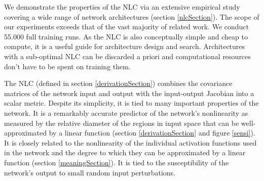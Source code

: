 \documentclass{article} %
\begin{document}
We demonstrate the properties of the NLC via an extensive empirical study covering a wide range of network architectures (section \ref{nlcSection}). The scope of our experiments exceeds that of the vast majority of related work. We conduct 55.000 full training runs. As the NLC is also conceptually simple and cheap to compute, it is a useful guide for architecture design and search. Architectures with a sub-optimal NLC can be discarded a priori and computational resources don't have to be spent on training them. 

The NLC (defined in section \ref{derivationSection}) combines the covariance matrices of the network input and output with the input-output Jacobian into a scalar metric. Despite its simplicity, it is tied to many important properties of the network. It is a remarkably accurate predictor of the network's nonlinearity as measured by the relative diameter of the regions in input space that can be well-approximated by a linear function (section \ref{derivationSection} and figure \ref{sensi}). It is closely related to the nonlinearity of the individual activation functions used in the network and the degree to which they can be approximated by a linear function (section \ref{meaningSection}). It is tied to the susceptibility of the network's output to small random input perturbations.






\end{document}
